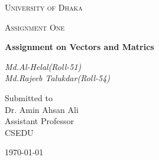 \documentclass[12pt,a4paper]{report}
\begin{document}
\begin{titlepage}
\centering
{\scshape\LARGE University of Dhaka \par}
\vspace{1cm}
{\scshape\Large Assignment One\par}
\vspace{1.5cm}
{\huge\bfseries Assignment on Vectors and Matrics\par}
\vspace{2cm}
{\Large\itshape Md.Al-Helal(Roll-51)\\Md.Rajeeb Talukdar(Roll-54)\par}
\vfill
Submitted to\\
\vspace{0.5cm}
Dr. Amin Ahsan Ali \\ Assistant Professor\\CSEDU
\vfill
{\large \today\par}
\end{titlepage}
\end{document}
